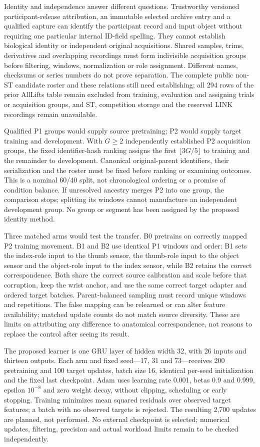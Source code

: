 Identity and independence answer different questions. Trustworthy versioned participant-release attribution, an immutable selected archive entry and a qualified capture can identify the participant record and input object without requiring one particular internal ID-field spelling. They cannot establish biological identity or independent original acquisitions. Shared samples, trims, derivatives and overlapping recordings must form indivisible acquisition groups before filtering, windows, normalization or role assignment. Different names, checksums or series numbers do not prove separation. The complete public non-ST candidate roster and these relations still need establishing; all 294 rows of the prior AllLifts table remain excluded from training, evaluation and assigning trials or acquisition groups, and ST, competition storage and the reserved LINK recordings remain unavailable.

Qualified P1 groups would supply source pretraining; P2 would supply target training and development. With $G\geq2$ independently established P2 acquisition groups, the fixed identifier-hash ranking assigns the first $\lfloor3G/5\rfloor$ to training and the remainder to development. Canonical original-parent identifiers, their serialization and the roster must be fixed before ranking or examining outcomes. This is a nominal 60/40 split, not chronological ordering or a promise of condition balance. If unresolved ancestry merges P2 into one group, the comparison stops; splitting its windows cannot manufacture an independent development group. No group or segment has been assigned by the proposed identity method.

Three matched arms would test the transfer. B0 pretrains on correctly mapped P2 training movement. B1 and B2 use identical P1 windows and order: B1 sets the index-role input to the thumb sensor, the thumb-role input to the object sensor and the object-role input to the index sensor, while B2 retains the correct correspondence. Both share the correct source calibration and scale before that corruption, keep the wrist anchor, and use the same correct target adapter and ordered target batches. Parent-balanced sampling must record unique windows and repetitions. The false mapping can be relearned or can alter feature availability; matched update counts do not match source diversity. These are limits on attributing any difference to anatomical correspondence, not reasons to replace the control after seeing its result.

The proposed learner is one GRU layer of hidden width 32, with 26 inputs and thirteen outputs. Each arm and fixed seed---17, 31 and 73---receives 200 pretraining and 100 target updates, batch size 16, identical per-seed initialization and the fixed last checkpoint. Adam uses learning rate 0.001, betas 0.9 and 0.999, epsilon $10^{-8}$ and zero weight decay, without clipping, scheduling or early stopping. Training minimizes mean squared residuals over observed target features; a batch with no observed targets is rejected. The resulting 2,700 updates are planned, not performed. No external checkpoint is selected; numerical updates, filtering, precision and actual workload limits remain to be checked independently.

